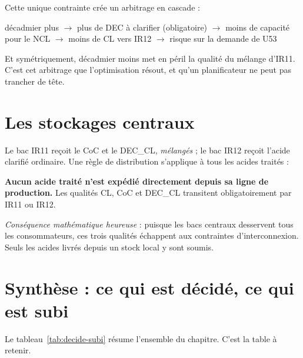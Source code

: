 \begin{encadre}[title={Le couplage central du problème}]
Cette unique contrainte crée un arbitrage en cascade :

\begin{center}
\small
décadmier plus $\rightarrow$ plus de DEC à clarifier (obligatoire) $\rightarrow$
moins de capacité pour le NCL $\rightarrow$ moins de CL vers IR12 $\rightarrow$
risque sur la demande de U53
\end{center}

Et symétriquement, décadmier moins met en péril la qualité du mélange d'IR11. C'est cet
arbitrage que l'optimisation résout, et qu'un planificateur ne peut pas trancher de tête.
\end{encadre}

\section{Les stockages centraux}

Le bac IR11 reçoit le CoC et le DEC\_CL, \emph{mélangés} ; le bac IR12 reçoit l'acide
clarifié ordinaire. Une règle de distribution s'applique à tous les acides traités :

\begin{encadre}
\textbf{Aucun acide traité n'est expédié directement depuis sa ligne de production.} Les
qualités CL, CoC et DEC\_CL transitent obligatoirement par IR11 ou IR12.

\emph{Conséquence mathématique heureuse} : puisque les bacs centraux desservent tous les
consommateurs, ces trois qualités échappent aux contraintes d'interconnexion. Seuls les
acides livrés depuis un stock local y sont soumis.
\end{encadre}

\section{Synthèse : ce qui est décidé, ce qui est subi}

Le tableau~\ref{tab:decide-subi} résume l'ensemble du chapitre. C'est la table à retenir.

